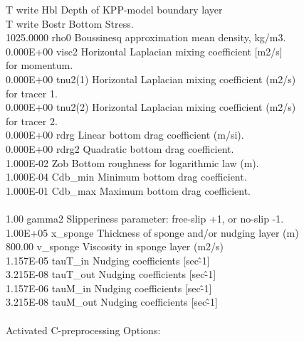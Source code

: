 T  write Hbl   Depth of KPP-model boundary layer\\
T  write Bostr Bottom Stress.\\
1025.0000  rho0     Boussinesq approximation mean density, kg/m3.\\
0.000E+00  visc2    Horizontal Laplacian mixing coefficient [m2/s]\\
for momentum.\\
0.000E+00  tnu2(1)  Horizontal Laplacian mixing coefficient (m2/s)\\
for tracer 1.\\
0.000E+00  tnu2(2)  Horizontal Laplacian mixing coefficient (m2/s)\\
for tracer 2.\\
0.000E+00  rdrg     Linear bottom drag coefficient (m/si).\\
0.000E+00  rdrg2    Quadratic bottom drag coefficient.\\
1.000E-02  Zob      Bottom roughness for logarithmic law (m).\\
1.000E-04  Cdb\_min  Minimum bottom drag coefficient.\\
1.000E-01  Cdb\_max  Maximum bottom drag coefficient.\\
\\
1.00  gamma2   Slipperiness parameter: free-slip +1, or no-slip -1.\\
1.00E+05  x\_sponge Thickness of sponge and/or nudging layer (m)\\
800.00  v\_sponge Viscosity in sponge layer (m2/s)\\
1.157E-05  tauT\_in  Nudging coefficients [sec\^-1]\\
3.215E-08  tauT\_out Nudging coefficients [sec\^-1]\\
1.157E-06  tauM\_in  Nudging coefficients [sec\^-1]\\
3.215E-08  tauM\_out Nudging coefficients [sec\^-1]\\
\\
Activated C-preprocessing Options:\\
\\
